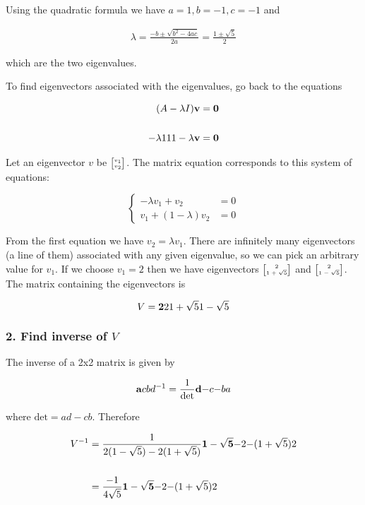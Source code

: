 Using the quadratic formula we have $a=1, b=-1, c=-1$ and

\begin{align*}
\lambda
= \frac{-b ± \sqrt{b^2 - 4ac}}{2a}
= \frac{1 ± \sqrt{5}}{2}
\end{align*}

which are the two eigenvalues.

To find eigenvectors associated with the eigenvalues, go back to the equations

\begin{align*}
(A - \lambda I)\mathbf v &= \mathbf 0
\\
\\
\mathbf{-\lambda}{1}
    {1       }{1 - \lambda} \mathbf v &= \mathbf 0
\end{align*}

Let an eigenvector $v$ be $\tiny{\begin{bmatrix}v_1\\v_2\end{bmatrix}}$. The matrix equation corresponds
to this system of equations:

$$
\begin{cases}
-\lambda v_1 + v_2               &= 0\\
v_1          + (1 - \lambda) v_2 &= 0
\end{cases}
$$

From the first equation we have $v_2 = \lambda v_1$. There are infinitely many
eigenvectors (a line of them) associated with any given eigenvalue, so we can
pick an arbitrary value for $v_1$. If we choose $v_1=2$ then we have
eigenvectors $\tiny{\begin{bmatrix}2\\1+\sqrt 5\end{bmatrix}}$ and $\tiny{\begin{bmatrix}2\\1-\sqrt 5\end{bmatrix}}$. The matrix
containing the eigenvectors is

$$
V = \mathbf{2          }{2          }
        {1 + \sqrt 5}{1 - \sqrt 5}
$$


\subsubsection{2. Find inverse of $V$}

The inverse of a 2x2 matrix is given by

$$
\mathbf{a}{c}
    {b}{d} ^ {-1}
=
\frac{1}{\text{det}} \mathbf{d}{-c}
                         {-b}{a}
$$

where $\text{det} = ad - cb$. Therefore

\begin{align*}
V^{-1}
&= \frac{1}{2(1 - \sqrt 5) - 2(1 + \sqrt 5)} \mathbf{1 - \sqrt 5 }{-2}
                                                 {-(1 + \sqrt 5)}{2}
\\\\
&= \frac{-1}{4\sqrt 5} \mathbf{1 - \sqrt 5 }{-2}
                           {-(1 + \sqrt 5)}{2}
\end{align*}


